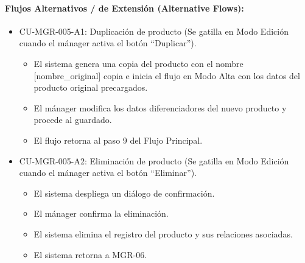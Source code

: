 \paragraph{Flujos Alternativos / de Extensión (Alternative Flows):}
\begin{itemize}
    \item CU-MGR-005-A1: Duplicación de producto (Se gatilla en Modo Edición cuando el mánager activa el botón ``Duplicar'').
    \begin{itemize}
        \item El sistema genera una copia del producto con el nombre [nombre\_original] copia e inicia el flujo en Modo Alta con los datos del producto original precargados.
        \item El mánager modifica los datos diferenciadores del nuevo producto y procede al guardado.
        \item El flujo retorna al paso 9 del Flujo Principal.
    \end{itemize}
    \item CU-MGR-005-A2: Eliminación de producto (Se gatilla en Modo Edición cuando el mánager activa el botón ``Eliminar'').
    \begin{itemize}
        \item El sistema despliega un diálogo de confirmación.
        \item El mánager confirma la eliminación.
        \item El sistema elimina el registro del producto y sus relaciones asociadas.
        \item El sistema retorna a MGR-06.
    \end{itemize}
\end{itemize}

